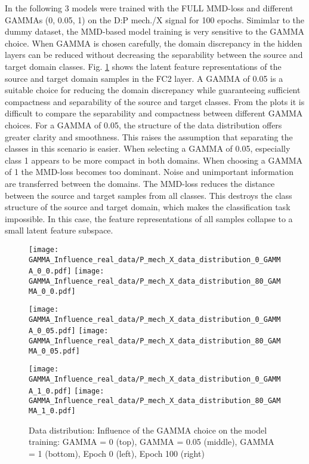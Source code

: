 In the following 3 models were trained with the FULL MMD-loss and different GAMMAs (0, 0.05, 1) on the  D:P mech./X signal for 100 epochs. Simimlar to the dummy dataset, the MMD-based model training is very sensitive to the GAMMA choice. When GAMMA is chosen carefully, the domain discrepancy in the hidden layers can be reduced without decreasing the separability between the source and target domain classes. Fig. \ref{fig:distribution_GAMMA_influence_real_data} shows the latent feature representations of the source and target domain samples in the FC2 layer. A GAMMA of 0.05 is a suitable choice for reducing the domain discrepancy while guaranteeing sufficient compactness and separability of the source and target classes. From the plots it is difficult to compare the separability and compactness between different GAMMA choices. For a GAMMA of 0.05, the structure of the data distribution offers greater clarity and smoothness. This raises the assumption that separating the classes in this scenario is easier. When selecting a GAMMA of 0.05, especially class 1 appears to be more compact in both domains. When choosing a GAMMA of 1 the MMD-loss becomes too dominant. Noise and unimportant information are transferred between the domains. The MMD-loss reduces the distance between the source and target samples from all classes. This destroys the class structure of the source and target domain, which makes the classification task impossible. In this case, the feature representations of all samples collapse to a small latent feature subspace.

\begin{figure}[H]
  \centering
  \texttt{[image: GAMMA\_Influence\_real\_data/P\_mech\_X\_data\_distribution\_0\_GAMMA\_0\_0.pdf]}
  \hspace{.4cm}
  \texttt{[image: GAMMA\_Influence\_real\_data/P\_mech\_X\_data\_distribution\_80\_GAMMA\_0\_0.pdf]}

  \vspace{.1cm}

  \texttt{[image: GAMMA\_Influence\_real\_data/P\_mech\_X\_data\_distribution\_0\_GAMMA\_0\_05.pdf]}
  \hspace{.4cm}
  \texttt{[image: GAMMA\_Influence\_real\_data/P\_mech\_X\_data\_distribution\_80\_GAMMA\_0\_05.pdf]}

  \vspace{.1cm}

  \texttt{[image: GAMMA\_Influence\_real\_data/P\_mech\_X\_data\_distribution\_0\_GAMMA\_1\_0.pdf]}
  \hspace{.4cm}
  \texttt{[image: GAMMA\_Influence\_real\_data/P\_mech\_X\_data\_distribution\_80\_GAMMA\_1\_0.pdf]}

  \vspace{.1cm}

  \caption{Data  distribution:  Influence of the GAMMA choice on the model training:  GAMMA  =  0  (top), GAMMA = 0.05 (middle), GAMMA = 1 (bottom), Epoch 0 (left), Epoch 100 (right)}
  \label{fig:distribution_GAMMA_influence_real_data}
\end{figure}


